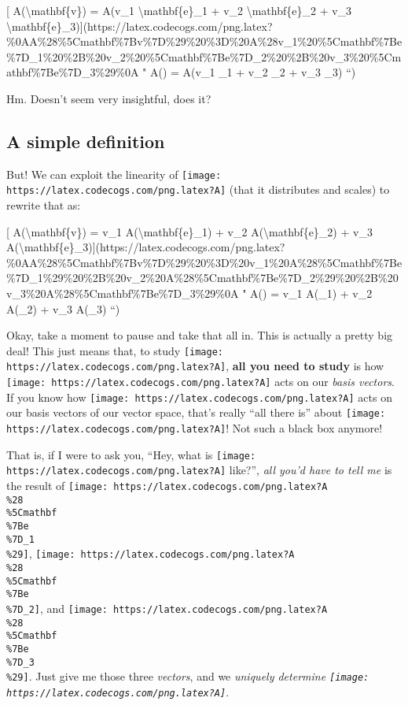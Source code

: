 \documentclass[]{article}
\begin{document}
{[} A(\textbackslash{}mathbf\{v\}) = A(v\_1 \textbackslash{}mathbf\{e\}\_1 +
v\_2 \textbackslash{}mathbf\{e\}\_2 + v\_3
\textbackslash{}mathbf\{e\}\_3){]}(https://latex.codecogs.com/png.latex?\%0AA\%28\%5Cmathbf\%7Bv\%7D\%29\%20\%3D\%20A\%28v\_1\%20\%5Cmathbf\%7Be\%7D\_1\%20\%2B\%20v\_2\%20\%5Cmathbf\%7Be\%7D\_2\%20\%2B\%20v\_3\%20\%5Cmathbf\%7Be\%7D\_3\%29\%0A
" A() = A(v\_1 \_1 + v\_2 \_2 + v\_3
\_3) ``)

Hm. Doesn't seem very insightful, does it?

\hypertarget{a-simple-definition}{%
\subsection{A simple definition}\label{a-simple-definition}}

But! We can exploit the linearity of
\texttt{[image: https://latex.codecogs.com/png.latex?A]} (that it distributes
and scales) to rewrite that as:

{[} A(\textbackslash{}mathbf\{v\}) = v\_1 A(\textbackslash{}mathbf\{e\}\_1) +
v\_2 A(\textbackslash{}mathbf\{e\}\_2) + v\_3
A(\textbackslash{}mathbf\{e\}\_3){]}(https://latex.codecogs.com/png.latex?\%0AA\%28\%5Cmathbf\%7Bv\%7D\%29\%20\%3D\%20v\_1\%20A\%28\%5Cmathbf\%7Be\%7D\_1\%29\%20\%2B\%20v\_2\%20A\%28\%5Cmathbf\%7Be\%7D\_2\%29\%20\%2B\%20v\_3\%20A\%28\%5Cmathbf\%7Be\%7D\_3\%29\%0A
" A() = v\_1 A(\_1) + v\_2 A(\_2) + v\_3
A(\_3) ``)

Okay, take a moment to pause and take that all in. This is actually a pretty big
deal! This just means that, to study
\texttt{[image: https://latex.codecogs.com/png.latex?A]}, \textbf{all you need
to study} is how \texttt{[image: https://latex.codecogs.com/png.latex?A]} acts
on our \emph{basis vectors}. If you know how
\texttt{[image: https://latex.codecogs.com/png.latex?A]} acts on our basis
vectors of our vector space, that's really ``all there is'' about
\texttt{[image: https://latex.codecogs.com/png.latex?A]}! Not such a black box
anymore!

That is, if I were to ask you, ``Hey, what is
\texttt{[image: https://latex.codecogs.com/png.latex?A]} like?'', \emph{all
you'd have to tell me} is the result of
\texttt{[image: https://latex.codecogs.com/png.latex?A\\\%28\\\%5Cmathbf\\\%7Be\\\%7D\_1\\\%29]},
\texttt{[image: https://latex.codecogs.com/png.latex?A\\\%28\\\%5Cmathbf\\\%7Be\\\%7D\_2]},
and
\texttt{[image: https://latex.codecogs.com/png.latex?A\\\%28\\\%5Cmathbf\\\%7Be\\\%7D\_3\\\%29]}.
Just give me those three \emph{vectors}, and we \emph{uniquely determine
\texttt{[image: https://latex.codecogs.com/png.latex?A]}}.
\end{document}
